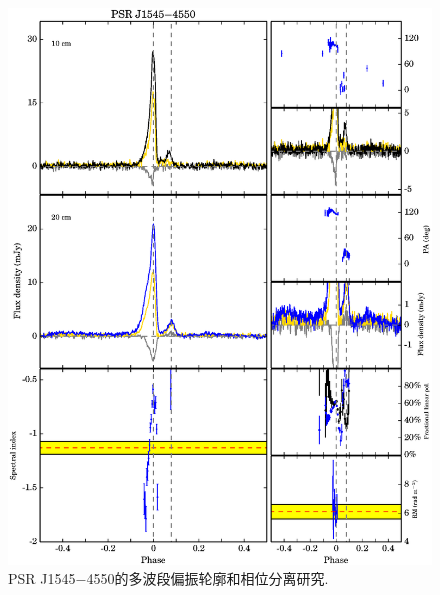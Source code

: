 \begin{figure}
\begin{center}
\includegraphics[width=6 in]{1545.ps}
\caption{PSR J1545$-$4550的多波段偏振轮廓和相位分离研究.}
\label{1545}
\end{center}
\end{figure}

